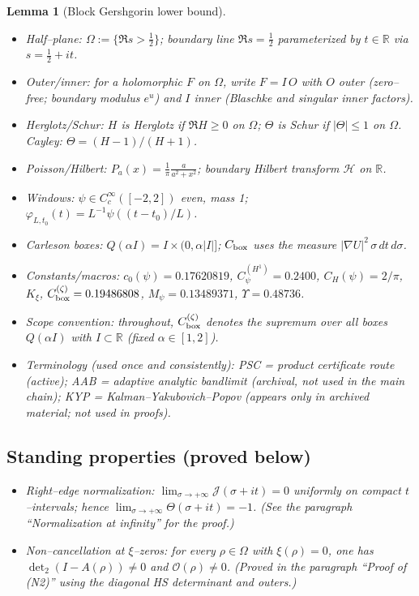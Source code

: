 \documentclass[11pt]{article}
\providecommand{\czeroplateau}{0.17620819}%
\providecommand{\CboxZeta}{K_0 + K_\xi}%
\providecommand{\CHone}{2/\pi}%
\newcommand{\Hilb}{\mathcal H}
\providecommand{\CpsiHone}{0.2400}%
\providecommand{\Mpsilocked}{(4/\pi)\,\CpsiHone\,\sqrt{\CboxZeta}}
\providecommand{\UpsilonLocked}{(2/\pi)\,\Mpsilocked/\czeroplateau}%
\renewcommand{\CboxZeta}{0.19486808}
\renewcommand{\Mpsilocked}{0.13489371}
\renewcommand{\UpsilonLocked}{0.48736}
\newtheorem{lemma}{Lemma}[section]
\theoremstyle{definition}
\theoremstyle{remark}
\newcommand{\R}{\mathbb{R}}
\begin{document}
\begin{lemma}[Block Gershgorin lower bound]
\begin{itemize}
\item Half–plane: $\Omega:=\{\Re s>\tfrac12\}$; boundary line $\Re s=\tfrac12$ parameterized by $t\in\R$ via $s=\tfrac12+it$.
\item Outer/inner: for a holomorphic $F$ on $\Omega$, write $F=I\,O$ with $O$ outer (zero–free; boundary modulus $e^{u}$) and $I$ inner (Blaschke and singular inner factors).
\item Herglotz/Schur: $H$ is Herglotz if $\Re H\ge 0$ on $\Omega$; $\Theta$ is Schur if $|\Theta|\le 1$ on $\Omega$. Cayley: $\Theta=(H-1)/(H+1)$.
\item Poisson/Hilbert: $P_a(x)=\tfrac{1}{\pi}\tfrac{a}{a^2+x^2}$; boundary Hilbert transform $\Hilb$ on $\R$.
\item Windows: $\psi\in C_c^\infty([-2,2])$ even, mass 1; $\varphi_{L,t_0}(t)=L^{-1}\psi((t-t_0)/L)$.
\item Carleson boxes: $Q(\alpha I)=I\times(0,\alpha|I|]$; $C_{\rm box}$ uses the measure $|\nabla U|^2\,\sigma\,dt\,d\sigma$.
\item Constants/macros: $c_0(\psi)=\czeroplateau$, $C_\psi^{(H^1)}=\CpsiHone$, $C_H(\psi)=\CHone$, $K_\xi$, $C_{\rm box}^{(\zeta)}=\CboxZeta$, $M_\psi=\Mpsilocked$, $\Upsilon=\UpsilonLocked$.
\item Scope convention: throughout, $C_{\rm box}^{(\zeta)}$ denotes the supremum over all boxes $Q(\alpha I)$ with $I\subset\mathbb R$ (fixed $\alpha\in[1,2]$).
\item Terminology (used once and consistently): PSC = product certificate route (active); AAB = adaptive analytic bandlimit (archival, not used in the main chain); KYP = Kalman–Yakubovich–Popov (appears only in archived material; not used in proofs).
\end{itemize}


\vspace{1.0cm}
\subsection*{Standing properties (proved below)}\label{sec:standing-assumptions}
\begin{itemize}
\item[(N1)] Right--edge normalization: $\displaystyle \lim_{\sigma\to+\infty}\mathcal J(\sigma+it)=0$ uniformly on compact $t$--intervals; hence $\lim_{\sigma\to+\infty}\Theta(\sigma+it)=-1$. (See the paragraph ``Normalization at infinity'' for the proof.)
\item[(N2)] Non--cancellation at $\xi$--zeros: for every $\rho\in\Omega$ with $\xi(\rho)=0$, one has $\det_2(I-A(\rho))\ne 0$ and $\mathcal O(\rho)\ne 0$. (Proved in the paragraph ``Proof of (N2)'' using the diagonal HS determinant and outers.)
\end{itemize}








\end{lemma}
\end{document}

